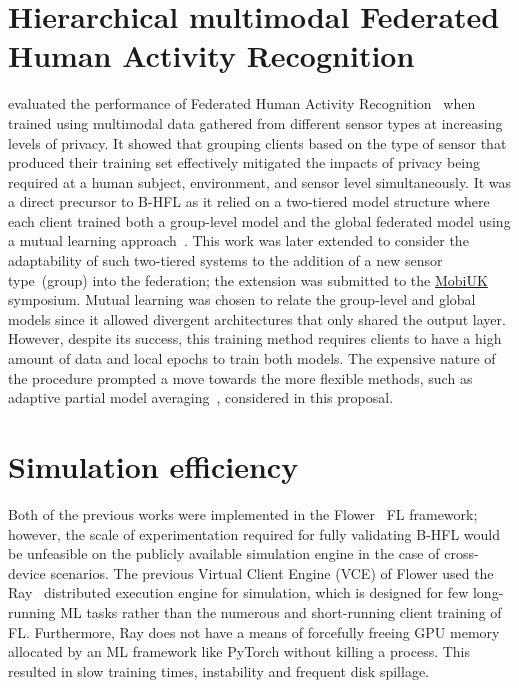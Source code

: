 \section{Hierarchical multimodal Federated Human Activity Recognition}
\citet{OperaWorkshop} evaluated the performance of Federated Human Activity Recognition~\citep{HARusingFL_2018} when trained using multimodal data gathered from different sensor types at increasing levels of privacy. It showed that grouping clients based on the type of sensor that produced their training set effectively mitigated the impacts of privacy being required at a human subject, environment, and sensor level simultaneously. It was a direct precursor to B-HFL as it relied on a two-tiered model structure where each client trained both a group-level model and the global federated model using a mutual learning approach~\citep{DeepMutualLearning}. This work was later extended to consider the adaptability of such two-tiered systems to the addition of a new sensor type~(group) into the federation; the extension was submitted to the \href{https://mobiuk.org/2023}{MobiUK} symposium. Mutual learning was chosen to relate the group-level and global models since it allowed divergent architectures that only shared the output layer. However, despite its success, this training method requires clients to have a high amount of data and local epochs to train both models. The expensive nature of the procedure prompted a move towards the more flexible methods, such as adaptive partial model averaging~\citep{FedOPT},  considered in this proposal.

\section{Simulation efficiency}
Both of the previous works were implemented in the Flower~\citep{Flower} FL framework; however, the scale of experimentation required for fully validating B-HFL would be unfeasible on the publicly available simulation engine in the case of cross-device scenarios. The previous Virtual Client Engine (VCE) of Flower used the Ray~\citep{RAY} distributed execution engine for simulation, which is designed for few long-running ML tasks rather than the numerous and short-running client training of FL\@. Furthermore, Ray does not have a means of forcefully freeing GPU memory allocated by an ML framework like PyTorch without killing a process. This resulted in slow training times, instability and frequent disk spillage.

